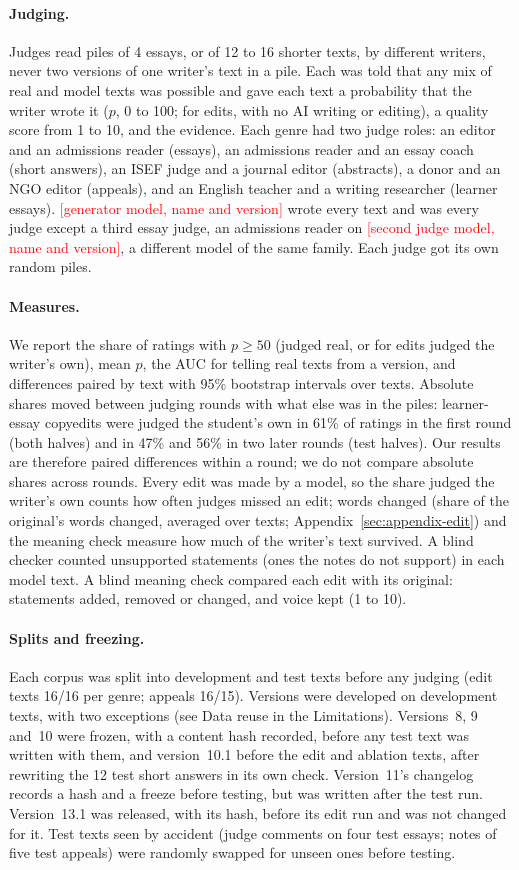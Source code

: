 \documentclass[11pt]{article}
\newcommand{\TBD}[1]{\textcolor{red}{[#1]}}
\newcommand{\genmodel}{\TBD{generator model, name and version}}
\newcommand{\judgemodel}{\TBD{second judge model, name and version}}
\newcommand{\shipver}{13.1}
\begin{document}
\paragraph{Judging.} Judges read piles of 4 essays, or of 12 to 16 shorter texts, by different writers, never two versions of one writer's text in a pile. Each was told that any mix of real and model texts was possible and gave each text a probability that the writer wrote it ($p$, 0 to 100; for edits, with no AI writing or editing), a quality score from 1 to 10, and the evidence. Each genre had two judge roles: an editor and an admissions reader (essays), an admissions reader and an essay coach (short answers), an ISEF judge and a journal editor (abstracts), a donor and an NGO editor (appeals), and an English teacher and a writing researcher (learner essays). \genmodel{} wrote every text and was every judge except a third essay judge, an admissions reader on \judgemodel{}, a different model of the same family. Each judge got its own random piles.

\paragraph{Measures.} We report the share of ratings with $p \geq 50$ (judged real, or for edits judged the writer's own), mean $p$, the AUC for telling real texts from a version, and differences paired by text with 95\% bootstrap intervals over texts. Absolute shares moved between judging rounds with what else was in the piles: learner-essay copyedits were judged the student's own in 61\% of ratings in the first round (both halves) and in 47\% and 56\% in two later rounds (test halves). Our results are therefore paired differences within a round; we do not compare absolute shares across rounds. Every edit was made by a model, so the share judged the writer's own counts how often judges missed an edit; words changed (share of the original's words changed, averaged over texts; Appendix~\ref{sec:appendix-edit}) and the meaning check measure how much of the writer's text survived. A blind checker counted unsupported statements (ones the notes do not support) in each model text. A blind meaning check compared each edit with its original: statements added, removed or changed, and voice kept (1 to 10).

\paragraph{Splits and freezing.} Each corpus was split into development and test texts before any judging (edit texts 16/16 per genre; appeals 16/15). Versions were developed on development texts, with two exceptions (see Data reuse in the Limitations). Versions~8, 9 and~10 were frozen, with a content hash recorded, before any test text was written with them, and version~10.1 before the edit and ablation texts, after rewriting the 12 test short answers in its own check. Version~11's changelog records a hash and a freeze before testing, but was written after the test run. Version~\shipver{} was released, with its hash, before its edit run and was not changed for it. Test texts seen by accident (judge comments on four test essays; notes of five test appeals) were randomly swapped for unseen ones before testing.
\end{document}
